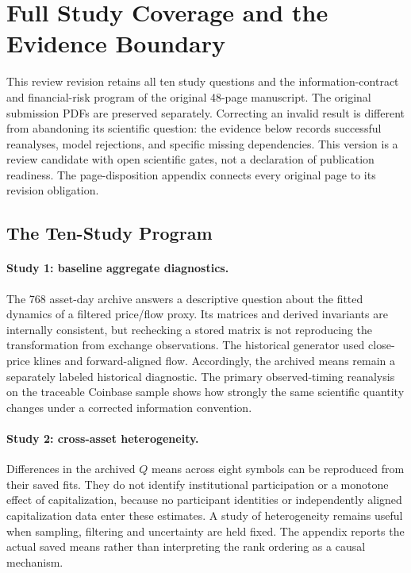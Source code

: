 
\clearpage
\appendix
\section{Full Study Coverage and the Evidence Boundary}
This review revision retains all ten study questions and the information-contract and financial-risk program of the original 48-page manuscript. The original submission PDFs are preserved separately. Correcting an invalid result is different from abandoning its scientific question: the evidence below records successful reanalyses, model rejections, and specific missing dependencies. This version is a review candidate with open scientific gates, not a declaration of publication readiness. The page-disposition appendix connects every original page to its revision obligation.

\subsection{The Ten-Study Program}
\paragraph{Study 1: baseline aggregate diagnostics.}
The 768 asset-day archive answers a descriptive question about the fitted dynamics of a filtered price/flow proxy. Its matrices and derived invariants are internally consistent, but rechecking a stored matrix is not reproducing the transformation from exchange observations. The historical generator used close-price klines and forward-aligned flow. Accordingly, the archived means remain a separately labeled historical diagnostic. The primary observed-timing reanalysis on the traceable Coinbase sample shows how strongly the same scientific quantity changes under a corrected information convention.

\paragraph{Study 2: cross-asset heterogeneity.}
Differences in the archived $Q$ means across eight symbols can be reproduced from their saved fits. They do not identify institutional participation or a monotone effect of capitalization, because no participant identities or independently aligned capitalization data enter these estimates. A study of heterogeneity remains useful when sampling, filtering and uncertainty are held fixed. The appendix reports the actual saved means rather than interpreting the rank ordering as a causal mechanism.

